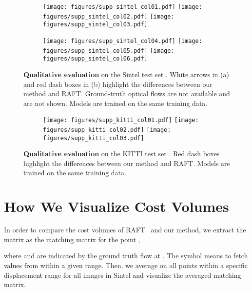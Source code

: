 \documentclass[10pt,twocolumn,letterpaper]{article}
\begin{document}
\begin{figure*}
  \centering
  \begin{subfigure}{1\linewidth}
      \texttt{[image: figures/supp\_sintel\_col01.pdf]}
      \texttt{[image: figures/supp\_sintel\_col02.pdf]}
      \texttt{[image: figures/supp\_sintel\_col03.pdf]}
      \caption{}
\end{subfigure}
  \begin{subfigure}{1\linewidth}
      \texttt{[image: figures/supp\_sintel\_col04.pdf]}
      \texttt{[image: figures/supp\_sintel\_col05.pdf]}
      \texttt{[image: figures/supp\_sintel\_col06.pdf]}
      \caption{}
\end{subfigure}
  \caption{{\bf Qualitative evaluation} on the Sintel test set \cite{butler2012naturalistic}. White arrows in (a) and red dash boxes in (b) highlight the differences between our method and RAFT. Ground-truth optical flows are not available and are not shown. Models are trained on the same training data.}  \label{fig:more_sintel}
\end{figure*}


\begin{figure*}
  \centering
  \begin{subfigure}{1\linewidth}
      \texttt{[image: figures/supp\_kitti\_col01.pdf]}
      \texttt{[image: figures/supp\_kitti\_col02.pdf]}
      \texttt{[image: figures/supp\_kitti\_col03.pdf]}
      \caption{}
\end{subfigure}
  \caption{{\bf Qualitative evaluation} on the KITTI test set \cite{menze2015object}. Red dash boxes highlight the differences between our method and RAFT. Models are trained on the same training data.}  \label{fig:more_kitti}
\end{figure*}



\section{How We Visualize Cost Volumes}

In order to compare the  cost volumes  of RAFT~\cite{teed2020raft} and our method, we extract the matrix  as the matching matrix for the point , 

where  and  are indicated by the ground truth flow at . The symbol  means to fetch values from  within a given range.
Then, we average  on all points within a specific displacement range for all images in Sintel and visualize the averaged matching matrix. 
\end{document}
